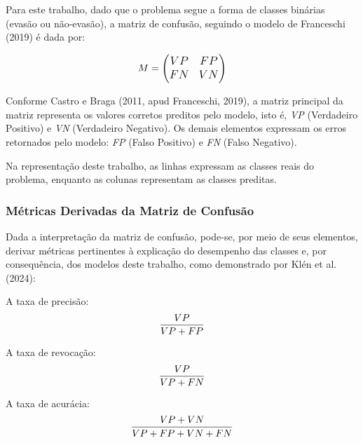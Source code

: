 \documentclass[english, spanish, brazilian]{RBIEarticle} %
\begin{document}
Para este trabalho, dado que o problema segue a forma de classes binárias (evasão ou não-evasão), a matriz de confusão, seguindo o modelo de Franceschi (2019) é dada por:

\vspace{0.5cm}
\begin{equation}
\large
M = 
\begin{pmatrix}
VP & FP \\
FN & VN
\end{pmatrix}
\end{equation}
\vspace{0.5cm}

Conforme Castro e Braga (2011, apud Franceschi, 2019), a matriz principal da matriz representa os valores corretos preditos pelo modelo, isto é, \textit{VP} (Verdadeiro Positivo) e \textit{VN} (Verdadeiro Negativo). Os demais elementos expressam os erros retornados pelo modelo: \textit{FP} (Falso Positivo) e \textit{FN} (Falso Negativo).

Na representação deste trabalho, as linhas expressam as classes reais do problema, enquanto as colunas representam as classes preditas.

\subsubsection{Métricas Derivadas da Matriz de Confusão}
Dada a interpretação da matriz de confusão, pode-se, por meio de seus elementos, derivar métricas pertinentes à explicação do desempenho das classes e, por consequência, dos modelos deste trabalho, como demonstrado por Klén et al. (2024):

\vspace{0.5cm}
A taxa de precisão:
\begin{equation}
    \large \frac{VP}{VP+FP}
\end{equation}
\vspace{0.5cm}

\vspace{0.5cm}
A taxa de revocação:
\begin{equation}
    \large \frac{VP}{VP+FN}
\end{equation}
\vspace{0.5cm}

\vspace{0.5cm}
A taxa de acurácia:
\begin{equation}
    \large \frac{VP+VN}{VP+FP+VN+FN}
\end{equation}
\vspace{0.5cm}
\end{document}
